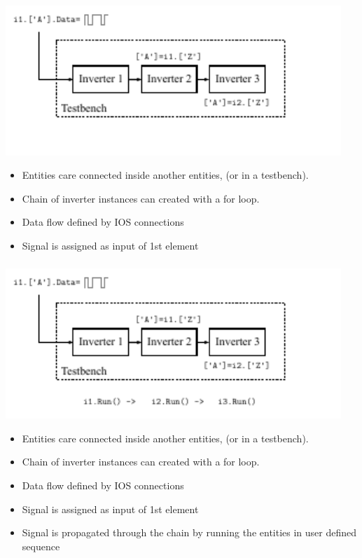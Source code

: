 \documentclass{sdkslides}
\begin{document}
\begin{frame}[t]
    \frametitle{\sectionname}
    \begin{center}
        \includegraphics[width=0.95\textwidth]{Pics/inverter_chain_3}
    \end{center}
    \begin{itemize}
        \item Entities care connected inside another entities, (or in a
            testbench).
        \item Chain of inverter instances can created with a for loop.
        \item Data flow defined by IOS connections
        \item Signal is assigned as input of 1st element
    \end{itemize}
\end{frame}

\begin{frame}[t]
    \frametitle{\sectionname}
    \begin{center}
        \includegraphics[width=0.95\textwidth]{Pics/inverter_chain_4}
    \end{center}
    \begin{itemize}
        \item Entities care connected inside another entities, (or in a
            testbench).
        \item Chain of inverter instances can created with a for loop.
        \item Data flow defined by IOS connections
        \item Signal is assigned as input of 1st element
        \item Signal is propagated through the chain by running the entities
            in user defined sequence
    \end{itemize}
\end{frame}
\end{document}

